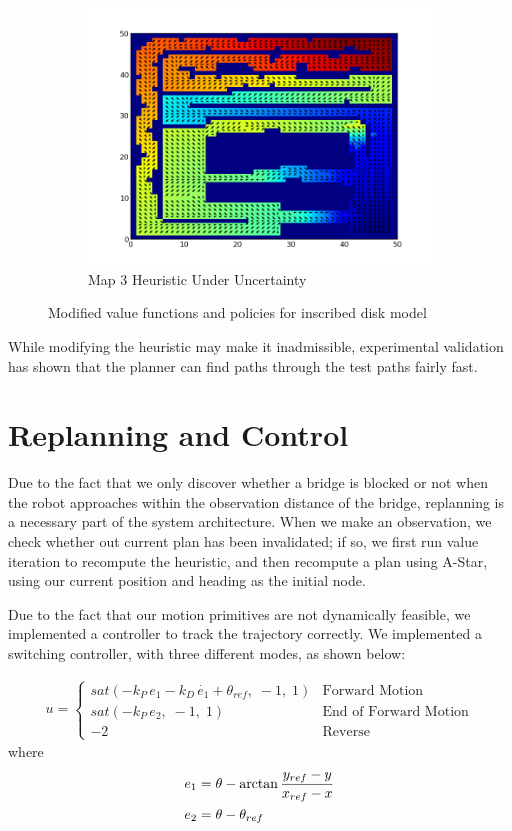 \documentclass{article}
\begin{document}
\begin{figure}[ht]
\begin{subfigure}[b]{0.45\textwidth}
        \includegraphics[width = \textwidth]{map3value_uncertain.png}
        \caption{Map 3 Heuristic Under Uncertainty}
        \label{fig:map3value_mod}
    \end{subfigure}
    \caption{Modified value functions and policies for inscribed disk model}
    \label{fig:valuefcns_mod}
\end{figure}

While modifying the heuristic may make it inadmissible, experimental validation has shown that the planner can find paths through the test paths fairly fast.


\section{Replanning and Control}

Due to the fact that we only discover whether a bridge is blocked or not when the robot approaches within the observation distance of the bridge, replanning is a necessary part of the system architecture. When we make an observation, we check whether out current plan has been invalidated; if so, we first run value iteration to recompute the heuristic, and then recompute a plan using A-Star, using our current position and heading as the initial node.

Due to the fact that our motion primitives are not dynamically feasible, we implemented a controller to track the trajectory correctly. We implemented a switching controller, with three different modes, as shown below:

\begin{align*}
u =
\begin{cases}
sat(-k_P\,e_1 - k_D\,\dot{e_1} + \theta_{ref},\; -1,\; 1) & \text{Forward Motion}\\
sat(-k_P\,e_2,\; -1,\; 1) & \text{End of Forward Motion}\\
-2 & \text{Reverse}
\end{cases}
\end{align*}
where 
\begin{align*}
\centering
e_1 &= \theta - \arctan{\frac{y_{ref} - y}{x_{ref} - x}}\\
e_2 &= \theta - \theta_{ref}
\end{align*}
\end{document}
